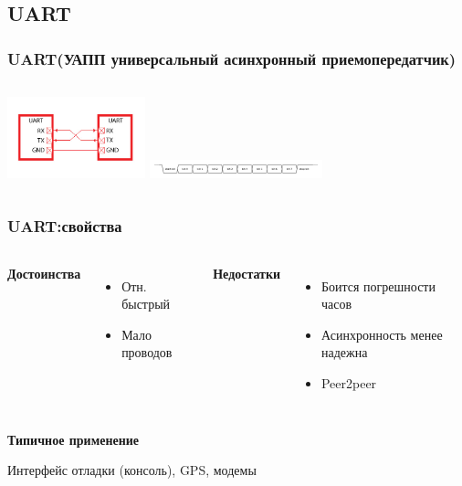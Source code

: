 \subsection{UART}
\begin{frame}
  \frametitle{UART(УАПП универсальный асинхронный приемопередатчик)}
  \begin{columns}
    \column{4cm}
    \includegraphics[width=4cm]{./slides/hardware_protocols/uart_bus.jpg}
    \column{4.5cm}
    \includegraphics[width=5cm]{./slides/hardware_protocols/UART_timing_diagram.png}
  \end{columns}
\end{frame}

\begin{frame}
  \frametitle{UART:свойства}
  \begin{columns}
    \column{4cm}
    \begin{center}
      {\bf\large Достоинства}
    \end{center}
    \begin{itemize}
       \item Отн. быстрый
       \item Мало проводов
    \end{itemize}
    \column{4cm}
    \begin{center}
      {\bf\large Недостатки}
    \end{center}
    \begin{itemize}
       \item Боится погрешности часов 
       \item Асинхронность менее надежна
       \item Peer2peer
    \end{itemize}
  \end{columns}
  \begin{center}
    {\bf\large Типичное применение}
  \end{center}
  Интерфейс отладки (консоль), GPS, модемы
\end{frame}


